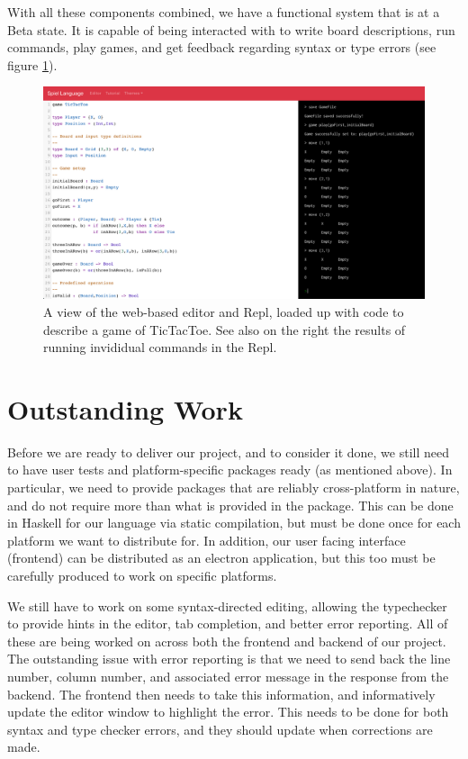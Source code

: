 \documentclass[onecolumn, draftclsnofoot,10pt, compsoc]{IEEEtran}
\begin{document}
\begin{singlespace}
    With all these components combined, we have a functional system that is at a Beta state. It is capable of being interacted with to write board descriptions, run commands, play games, and get feedback regarding syntax or type errors (see figure \ref{fig:r1}).
    
    \begin{figure}
        \includegraphics[width=1.0\textwidth,keepaspectratio]{./img/p1}
        \caption{A view of the web-based editor and Repl, loaded up with code to describe a game of TicTacToe. See also on the right the results of running invididual commands in the Repl.}
        \label{fig:r1}
    \end{figure}
    
\section{Outstanding Work}
    Before we are ready to deliver our project, and to consider it done, we still need to have user tests and platform-specific packages ready (as mentioned above). In particular, we need to provide packages that are reliably cross-platform in nature, and do not require more than what is provided in the package. This can be done in Haskell for our language via static compilation, but must be done once for each platform we want to distribute for. In addition, our user facing interface (frontend) can be distributed as an electron application, but this too must be carefully produced to work on specific platforms.
    
    We still have to work on some syntax-directed editing, allowing the typechecker to provide hints in the editor, tab completion, and better error reporting. All of these are being worked on across both the frontend and backend of our project. The outstanding issue with error reporting is that we need to send back the line number, column number, and associated error message in the response from the backend. The frontend then needs to take this information, and informatively update the editor window to highlight the error. This needs to be done for both syntax and type checker errors, and they should update when corrections are made.
    

\end{singlespace}
\end{document}
